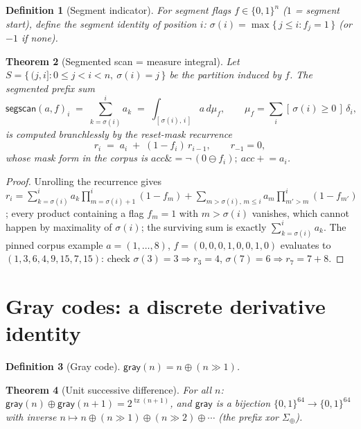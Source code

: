 \documentclass[11pt,a4paper]{report}
\newtheorem{theorem}{Theorem}[chapter]
\newtheorem{definition}[theorem]{Definition}
\newcommand{\sel}[1]{\left[\,#1\,\right]}
\DeclareMathOperator{\tz}{tz}
\begin{document}
\begin{definition}[Segment indicator]
For segment flags $f \in \{0,1\}^n$ ($1$ = segment start), define the
segment identity of position $i$:
$\sigma(i) = \max\{\, j \le i : f_j = 1 \,\}$ (or $-1$ if none).
\end{definition}

\begin{theorem}[Segmented scan = measure integral]\label{thm:segscan}
Let $S = \{\, (j, i] : 0 \le j < i < n,\ \sigma(i) = j \,\}$ be the
partition induced by $f$. The segmented prefix sum
\begin{equation}
\mathsf{segscan}(a, f)_i \;=\; \sum_{k = \sigma(i)}^{i} a_k
\;=\; \int_{[\,\sigma(i),\, i\,]} a \, d\mu_f,
\qquad
\mu_f = \sum_{i} \sel{\sigma(i) \ge 0}\, \delta_i,
\end{equation}
is computed branchlessly by the reset-mask recurrence
\begin{equation}
r_{i} \;=\; a_i \;+\; (1 - f_i)\, r_{i-1},
\qquad r_{-1} = 0,
\end{equation}
whose mask form in the corpus is
$\mathit{acc} \mathrel{\&}= \lnot\,(0 \ominus f_i);\ \mathit{acc}
\mathrel{+}= a_i$.
\end{theorem}

\begin{proof}
Unrolling the recurrence gives
$r_i = \sum_{k=\sigma(i)}^{i} a_k \prod_{m=\sigma(i)+1}^{i}(1-f_m) +
\sum_{m > \sigma(i),\, m \le i} a_m \prod_{m' > m}^{i}(1 - f_{m'})$;
every product containing a flag $f_m = 1$ with $m > \sigma(i)$ vanishes,
which cannot happen by maximality of $\sigma(i)$; the surviving sum is
exactly $\sum_{k=\sigma(i)}^{i} a_k$. The pinned corpus example
$a = (1,\dots,8)$, $f = (0,0,0,1,0,0,1,0)$ evaluates to
$(1,3,6,4,9,15,7,15)$: check
$\sigma(3)=3 \Rightarrow r_3 = 4$, $\sigma(7) = 6 \Rightarrow r_7 = 7+8$.
\end{proof}

\section{Gray codes: a discrete derivative identity}

\begin{definition}[Gray code]
$\mathsf{gray}(n) = n \oplus (n \gg 1)$.
\end{definition}

\begin{theorem}[Unit successive difference]\label{thm:gray}
For all $n$: $\mathsf{gray}(n) \oplus \mathsf{gray}(n+1) =
2^{\tz(n+1)}$, and $\mathsf{gray}$ is a bijection
$\{0,1\}^{64} \to \{0,1\}^{64}$ with inverse
$n \mapsto n \oplus (n \gg 1) \oplus (n \gg 2) \oplus \cdots$
(the prefix xor $\Sigma_{\oplus}$).
\end{theorem}
\end{document}
